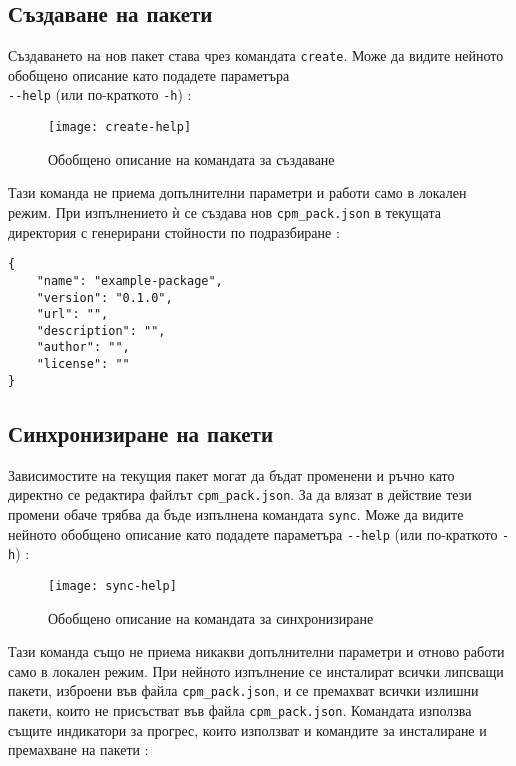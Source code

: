 \subsection{Създаване на пакети}

Създаването на нов пакет става чрез командата \texttt{create}. Може да видите
нейното обобщено описание като подадете параметъра \\
\texttt{-{}-help} (или по-краткото \texttt{-h}) :

\begin{figure}[h]
    \centering
    \texttt{[image: create-help]}
    \caption{Обобщено описание на командата за създаване}
    \label{fig:create-help}
\end{figure}

Тази команда не приема допълнителни параметри и работи само в локален режим.
При изпълнението ѝ се създава нов \texttt{cpm\_pack.json} в текущата директория
с генерирани стойности по подразбиране :


\begin{lstlisting}[style=json,
                   caption=cpm\_pack.json по подразбиране,
                   label={lst:default-cpm-pack-json}]
{
    "name": "example-package",
    "version": "0.1.0",
    "url": "",
    "description": "",
    "author": "",
    "license": ""
}
\end{lstlisting}


\subsection{Синхронизиране на пакети}

Зависимостите на текущия пакет могат да бъдат променени и ръчно като директно се
редактира файлът \texttt{cpm\_pack.json}. За да влязат в действие тези промени
обаче трябва да бъде изпълнена командата \texttt{sync}. Може да видите нейното
обобщено описание като подадете параметъра \texttt{-{}-help} (или по-краткото
\texttt{-h}) :

\begin{figure}[h]
    \centering
    \texttt{[image: sync-help]}
    \caption{Обобщено описание на командата за синхронизиране}
    \label{fig:sync-help}
\end{figure}

Тази команда също не приема никакви допълнителни параметри и отново работи само
в локален режим. При нейното изпълнение се инсталират всички липсващи пакети,
изброени във файла \texttt{cpm\_pack.json}, и се премахват всички излишни
пакети, които не присъстват във файла \texttt{cpm\_pack.json}. Командата
използва същите индикатори за прогрес, които използват и командите за
инсталиране и премахване на пакети :

